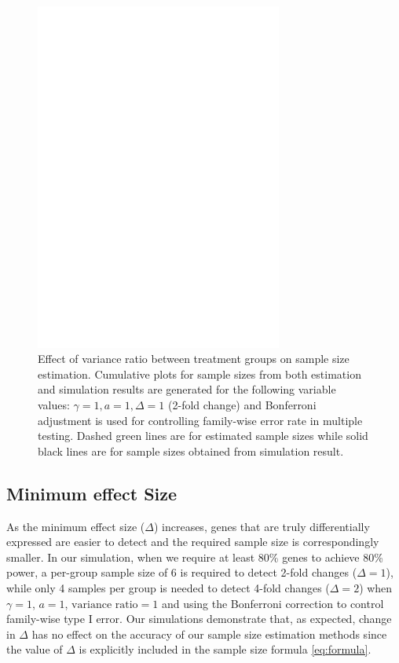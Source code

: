 \documentclass{bioinfo}
\begin{document}
\begin{figure}[h]
  \centerline{\includegraphics*[width=3.2in]{ResVarF.pdf}}
  \caption[Effect of variance ratio between treatment groups on sample size estimation]
  {Effect of variance ratio between treatment groups on sample size estimation.
    Cumulative plots for sample sizes from both estimation and simulation
    results are generated for the following variable values: $\gamma = 1, a = 1, \Delta = 1$ (2-fold
    change) and Bonferroni adjustment is used for controlling family-wise error rate in multiple testing. Dashed green lines are for estimated sample sizes
    while solid black lines are for sample sizes obtained from simulation result.}
  \label{fig:ResVar}
\end{figure}

\subsection{Minimum effect Size}

As the minimum effect size ($\Delta$) increases, genes that are
truly differentially expressed are easier to detect and the
required sample size is correspondingly smaller.  In our
simulation, when we require at least 80\% genes to achieve 80\%
power, a per-group sample size of 6 is required to detect 2-fold
changes ($\Delta = 1$), while only 4 samples per group is needed
to detect 4-fold changes ($\Delta = 2$) when $\gamma=1$, $a=1$,
$\text{variance ratio}=1$ and using the Bonferroni correction to
control family-wise type I error. Our simulations demonstrate
that, as expected, change in $\Delta$ has no effect on the
accuracy of our sample size estimation methods since the value of
$\Delta$ is explicitly included in the sample size formula
\ref{eq:formula}.
\end{document}
